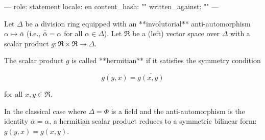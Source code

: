---
role: statement
locale: en
content_hash: ""
written_against: ""
---

Let $\Delta$ be a division ring equipped with an **involutorial** anti-automorphism $\alpha \mapsto \bar{\alpha}$ (i.e., $\bar{\bar{\alpha}} = \alpha$ for all $\alpha \in \Delta$). Let $\mathfrak{R}$ be a (left) vector space over $\Delta$ with a scalar product $g : \mathfrak{R} \times \mathfrak{R} \to \Delta$.

The scalar product $g$ is called **hermitian** if it satisfies the symmetry condition

$$g(y, x) = \overline{g(x, y)}$$

for all $x, y \in \mathfrak{R}$.

In the classical case where $\Delta = \Phi$ is a field and the anti-automorphism is the identity $\bar{\alpha} = \alpha$, a hermitian scalar product reduces to a symmetric bilinear form: $g(y, x) = g(x, y)$.
